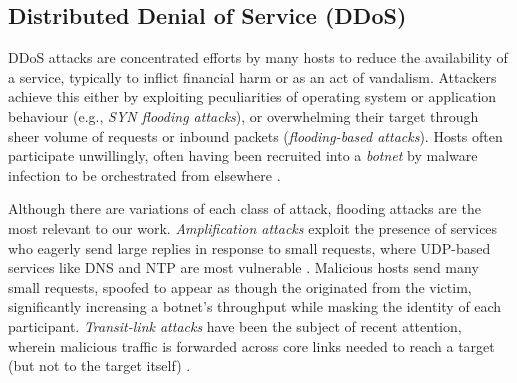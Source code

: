 \documentclass[conference, letterpaper, 10pt, times]{IEEEtran}
\begin{document}


\subsection{Distributed Denial of Service (DDoS)}


DDoS attacks are concentrated efforts by many hosts to reduce the availability of a service, typically to inflict financial harm or as an act of vandalism.
Attackers achieve this either by exploiting peculiarities of operating system or application behaviour (e.g., \emph{SYN flooding attacks}), or overwhelming their target through sheer volume of requests or inbound packets (\emph{flooding-based attacks}).
Hosts often participate unwillingly, often having been recruited into a \emph{botnet} by malware infection to be orchestrated from elsewhere \cite{DBLP:conf/uss/AntonakakisABBB17}.

Although there are variations of each class of attack, flooding attacks are the most relevant to our work.
\emph{Amplification attacks} exploit the presence of services who eagerly send large replies in response to small requests, where UDP-based services like DNS and NTP are most vulnerable \cite{DBLP:conf/ndss/Rossow14, DBLP:conf/uss/KuhrerHRH14}.
Malicious hosts send many small requests, spoofed to appear as though the originated from the victim, significantly increasing a botnet's throughput while masking the identity of each participant.
\emph{Transit-link attacks} have been the subject of recent attention, wherein malicious traffic is forwarded across core links needed to reach a target (but not to the target itself) \cite{DBLP:conf/sp/KangLG13, DBLP:conf/esorics/StuderP09}.
\end{document}
